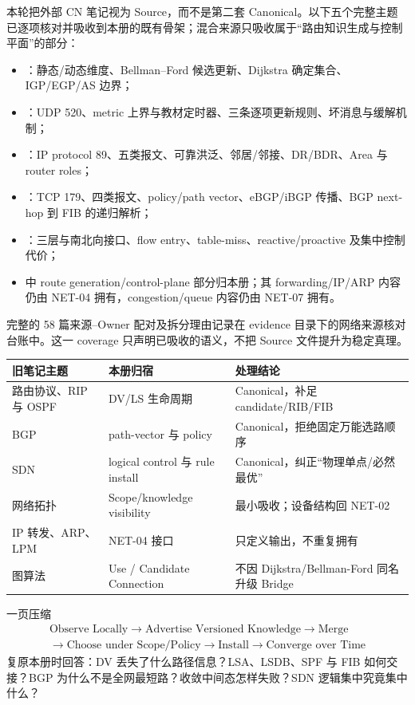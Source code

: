 \documentclass[11pt,a4paper]{ctexart}
\begin{document}
本轮把外部 CN 笔记视为 Source，而不是第二套 Canonical。以下五个完整主题已逐项核对并吸收到本册的既有骨架；混合来源只吸收属于“路由知识生成与控制平面”的部分：
\begin{itemize}
  \item {}：静态/动态维度、Bellman--Ford 候选更新、Dijkstra 确定集合、IGP/EGP/AS 边界；
  \item {}：UDP 520、metric 上界与教材定时器、三条逐项更新规则、坏消息与缓解机制；
  \item {}：IP protocol 89、五类报文、可靠洪泛、邻居/邻接、DR/BDR、Area 与 router roles；
  \item {}：TCP 179、四类报文、policy/path vector、eBGP/iBGP 传播、BGP next-hop 到 FIB 的递归解析；
  \item {}：三层与南北向接口、flow entry、table-miss、reactive/proactive 及集中控制代价；
  \item {} 中 route generation/control-plane 部分归本册；其 forwarding/IP/ARP 内容仍由 NET-04 拥有，congestion/queue 内容仍由 NET-07 拥有。
\end{itemize}

完整的 58 篇来源--Owner 配对及拆分理由记录在 evidence 目录下的网络来源核对台账中。这一 coverage 只声明已吸收的语义，不把 Source 文件提升为稳定真理。

\begin{center}
\small
\begin{tabularx}{\linewidth}{L{3.1cm}Y Y}
\toprule
旧笔记主题 & 本册归宿 & 处理结论\\
\midrule
路由协议、RIP 与 OSPF & DV/LS 生命周期 & Canonical，补足 candidate/RIB/FIB\\
BGP & path-vector 与 policy & Canonical，拒绝固定万能选路顺序\\
SDN & logical control 与 rule install & Canonical，纠正“物理单点/必然最优”\\
网络拓扑 & Scope/knowledge visibility & 最小吸收；设备结构回 NET-02\\
IP 转发、ARP、LPM & NET-04 接口 & 只定义输出，不重复拥有\\
图算法 & Use / Candidate Connection & 不因 Dijkstra/Bellman-Ford 同名升级 Bridge\\
\bottomrule
\end{tabularx}
\end{center}

\begin{corebox}{一页压缩}
\[
\boxed{\begin{gathered}
\text{Observe Locally}\to\text{Advertise Versioned Knowledge}\to\text{Merge}\\
\to\text{Choose under Scope/Policy}\to\text{Install}\to\text{Converge over Time}
\end{gathered}}
\]
复原本册时回答：DV 丢失了什么路径信息？LSA、LSDB、SPF 与 FIB 如何交接？BGP 为什么不是全网最短路？收敛中间态怎样失败？SDN 逻辑集中究竟集中什么？
\end{corebox}
\end{document}
